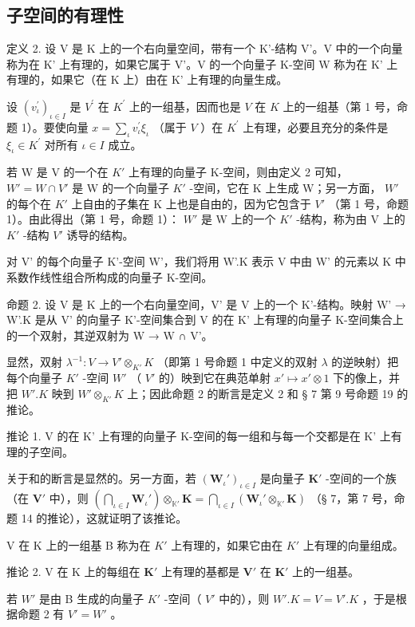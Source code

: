 \subsection{子空间的有理性}

定义 2. 设 V 是 K 上的一个右向量空间，带有一个 K'-结构 V'。V 中的一个向量称为在 K' 上有理的，如果它属于 V'。V 的一个向量子 K-空间 W 称为在 K' 上有理的，如果它（在 K 上）由在 K' 上有理的向量生成。

设 \((v_{\iota}^{\prime})_{\iota\in I}\) 是 \(V^{\prime}\) 在 \(K^{\prime}\) 上的一组基，因而也是 \(V\) 在 \(K\) 上的一组基（第 1 号，命题 1）。要使向量 \(x = \sum_{\iota} v_{\iota}^{\prime} \xi_{\iota}\) （属于 \(V\) ）在 \(K^{\prime}\) 上有理，必要且充分的条件是 \(\xi_{\iota} \in K^{\prime}\) 对所有 \(\iota \in I\) 成立。

若 W 是 V 的一个在 \(K'\) 上有理的向量子 K-空间，则由定义 2 可知， \(W' = W \cap V'\) 是 W 的一个向量子 \(K'\) -空间，它在 K 上生成 W；另一方面， \(W'\) 的每个在 \(K'\) 上自由的子集在 K 上也是自由的，因为它包含于 \(V'\) （第 1 号，命题 1）。由此得出（第 1 号，命题 1）： \(W'\) 是 W 上的一个 \(K'\) -结构，称为由 V 上的 \(K'\) -结构 \(V'\) 诱导的结构。

对 V' 的每个向量子 K'-空间 W'，我们将用 W'.K 表示 V 中由 W' 的元素以 K 中系数作线性组合所构成的向量子 K-空间。

命题 2. 设 V 是 K 上的一个右向量空间，V' 是 V 上的一个 K'-结构。映射 W' → W'.K 是从 V' 的向量子 K'-空间集合到 V 的在 K' 上有理的向量子 K-空间集合上的一个双射，其逆双射为 W → W ∩ V'。

显然，双射 \(\lambda^{-1}: V \to V' \otimes_{K'} K\) （即第 1 号命题 1 中定义的双射 \(\lambda\) 的逆映射）把每个向量子 \(K'\) -空间 \(W'\) （ \(V'\) 的）映到它在典范单射 \(x' \mapsto x' \otimes 1\) 下的像上，并把 \(W'. K\) 映到 \(W' \otimes_{K'} K\) 上；因此命题 2 的断言是定义 2 和 § 7 第 9 号命题 19 的推论。

推论 1. V 的在 K' 上有理的向量子 K-空间的每一组和与每一个交都是在 K' 上有理的子空间。

关于和的断言是显然的。另一方面，若 \((\mathbf{W}_{\iota}')_{\iota \in I}\) 是向量子 \(\mathbf{K}'\) -空间的一个族（在 \(\mathbf{V}'\) 中），则 \(\left(\bigcap_{\iota \in I} \mathbf{W}_{\iota}'\right) \otimes_{\mathbb{K}'} \mathbf{K} = \bigcap_{\iota \in I} (\mathbf{W}_{\iota}' \otimes_{\mathbb{K}'} \mathbf{K})\) （§ 7，第 7 号，命题 14 的推论），这就证明了该推论。

V 在 K 上的一组基 B 称为在 \(K'\) 上有理的，如果它由在 \(K'\) 上有理的向量组成。

推论 2. V 在 K 上的每组在 \(\mathbf{K}'\) 上有理的基都是 \(\mathbf{V}'\) 在 \(\mathbf{K}'\) 上的一组基。

若 \(W'\) 是由 B 生成的向量子 \(K'\) -空间（ \(V'\) 中的），则 \(W'. K = V = V'. K\) ，于是根据命题 2 有 \(V' = W'\) 。

